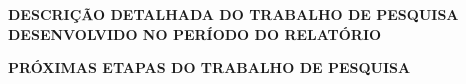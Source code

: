 \documentclass[12pt,a4paper,final]{report}%
\begin{document}



\begin{center}
\textbf{DESCRIÇÃO DETALHADA DO TRABALHO DE PESQUISA DESENVOLVIDO NO PERÍODO  DO RELATÓRIO}
\end{center}





\pagebreak%


\begin{center}
\textbf{PRÓXIMAS ETAPAS DO TRABALHO DE PESQUISA}
\end{center}


\end{document}
